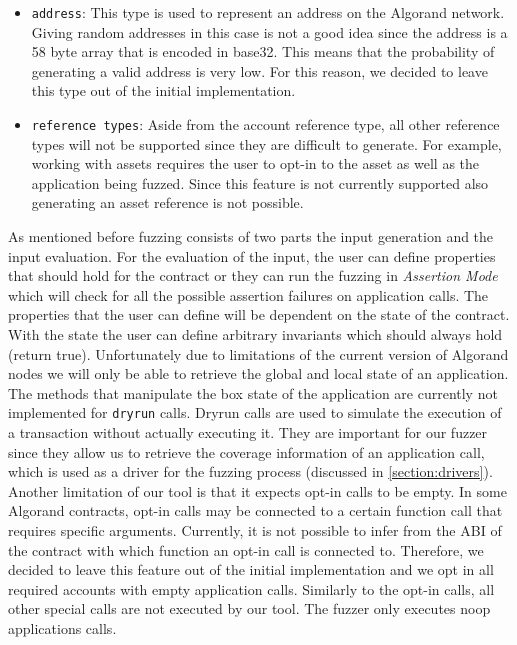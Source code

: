 \begin{itemize}
    \item \texttt{address}: This type is used to represent an address on the Algorand network.
          Giving random addresses in this case is not a good idea since the address is a 58 byte array that is encoded in base32.
          This means that the probability of generating a valid address is very low. For this reason, we decided to leave this type out of the initial implementation.
    \item \texttt{reference types}: Aside from the account reference type, all other reference types will not be supported since they are difficult to generate.
          For example, working with assets requires the user to opt-in to the asset as well as the application being fuzzed.
          Since this feature is not currently supported also generating an asset reference is not possible.
\end{itemize}

As mentioned before fuzzing consists of two parts the input generation and the input evaluation.
For the evaluation of the input, the user can define properties that should hold for the contract or they can run the fuzzing in \textit{Assertion Mode} which will check for all the possible assertion failures on application calls.
The properties that the user can define will be dependent on the state of the contract.
With the state the user can define arbitrary invariants which should always hold (return true).
Unfortunately due to limitations of the current version of Algorand nodes we will only be able to retrieve the global and local state of an application.
The methods that manipulate the box state of the application are currently not implemented for \texttt{dryrun} calls.
Dryrun calls are used to simulate the execution of a transaction without actually executing it.
They are important for our fuzzer since they allow us to retrieve the coverage information of an application call, which is used as a driver for the fuzzing process (discussed in \ref{section:drivers}).
Another limitation of our tool is that it expects opt-in calls to be empty.
In some Algorand contracts, opt-in calls may be connected to a certain function call that requires specific arguments.
Currently, it is not possible to infer from the \ac{ABI} of the contract with which function an opt-in call is connected to.
Therefore, we decided to leave this feature out of the initial implementation and we opt in all required accounts with empty application calls.
Similarly to the opt-in calls, all other special calls are not executed by our tool.
The fuzzer only executes noop applications calls.

